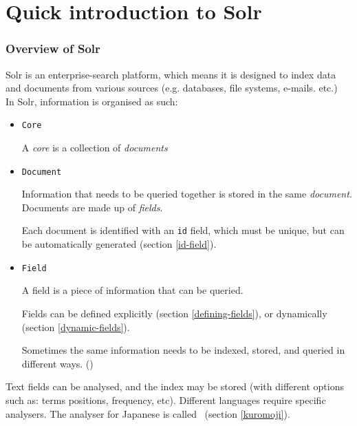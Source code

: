 
\renewcommand{\currentPart}{Quick introduction to Solr}
\part{\currentPart}  \label{part- Quick introduction to Solr}


\section{Overview of Solr}

Solr is an enterprise-search platform, which means it is designed to index data and documents from various sources (e.g. databases, file systems, e-mails. etc.) \\


In Solr, information is organised as such:

\begin{itemize}
	\item \texttt{Core} \hfill
	
	A \emph{core} is a collection of \emph{documents}
	
	\item \texttt{Document} \hfill
		
	Information that needs to be queried together is stored in the same \emph{document}. Documents are made up of \emph{fields}.
	
	Each document is identified with an \texttt{id} field, which must be unique, but can be automatically generated (section \ref{id-field}).
	
	\item \texttt{Field} \hfill
	
	A field is a piece of information that can be queried.
	
	Fields can be defined explicitly (section \ref{defining-fields}), or dynamically (section \ref{dynamic-fields}).
	
	Sometimes the same information needs to be indexed, stored, and queried in different ways. ()
\end{itemize}


Text fields can be analysed, and the index may be stored (with different options such as: terms positions, frequency, etc). Different languages require specific analysers. The analyser for Japanese is called \kuromoji\ (section \ref{kuromoji}).






